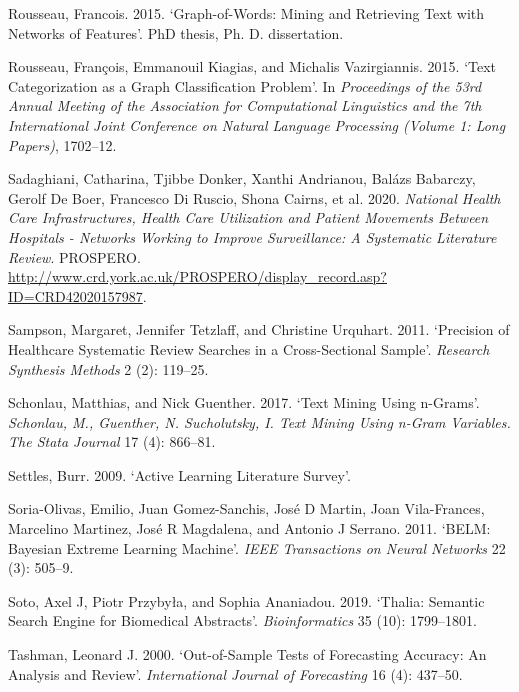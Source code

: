 \documentclass{article}
\newlength{\cslhangindent}
\newlength{\cslentryspacingunit} %
\newenvironment{CSLReferences}[2] %
 {%
  \setlength{\parindent}{0pt}
  \ifodd #1
  \let\oldpar\par
  \def\par{\hangindent=\cslhangindent\oldpar}
  \fi
  \setlength{\parskip}{#2\cslentryspacingunit}
 }%
 {}
\begin{document}
\begin{CSLReferences}{1}{0}
\leavevmode{}%
Rousseau, Francois. 2015. {`Graph-of-Words: Mining and Retrieving Text
with Networks of Features'}. PhD thesis, Ph. D. dissertation.

\leavevmode{}%
Rousseau, François, Emmanouil Kiagias, and Michalis Vazirgiannis. 2015.
{`Text Categorization as a Graph Classification Problem'}. In
\emph{Proceedings of the 53rd Annual Meeting of the Association for
Computational Linguistics and the 7th International Joint Conference on
Natural Language Processing (Volume 1: Long Papers)}, 1702--12.

\leavevmode{}%
Sadaghiani, Catharina, Tjibbe Donker, Xanthi Andrianou, Balázs Babarczy,
Gerolf De Boer, Francesco Di Ruscio, Shona Cairns, et al. 2020.
\emph{National Health Care Infrastructures, Health Care Utilization and
Patient Movements Between Hospitals - Networks Working to Improve
Surveillance: A Systematic Literature Review}. PROSPERO.
\url{http://www.crd.york.ac.uk/PROSPERO/display_record.asp?ID=CRD42020157987}.

\leavevmode{}%
Sampson, Margaret, Jennifer Tetzlaff, and Christine Urquhart. 2011.
{`Precision of Healthcare Systematic Review Searches in a
Cross-Sectional Sample'}. \emph{Research Synthesis Methods} 2 (2):
119--25.

\leavevmode{}%
Schonlau, Matthias, and Nick Guenther. 2017. {`Text Mining Using
n-Grams'}. \emph{Schonlau, M., Guenther, N. Sucholutsky, I. Text Mining
Using n-Gram Variables. The Stata Journal} 17 (4): 866--81.

\leavevmode{}%
Settles, Burr. 2009. {`Active Learning Literature Survey'}.

\leavevmode{}%
Soria-Olivas, Emilio, Juan Gomez-Sanchis, José D Martin, Joan
Vila-Frances, Marcelino Martinez, José R Magdalena, and Antonio J
Serrano. 2011. {`BELM: Bayesian Extreme Learning Machine'}. \emph{IEEE
Transactions on Neural Networks} 22 (3): 505--9.

\leavevmode{}%
Soto, Axel J, Piotr Przybyła, and Sophia Ananiadou. 2019. {`Thalia:
Semantic Search Engine for Biomedical Abstracts'}. \emph{Bioinformatics}
35 (10): 1799--1801.

\leavevmode{}%
Tashman, Leonard J. 2000. {`Out-of-Sample Tests of Forecasting Accuracy:
An Analysis and Review'}. \emph{International Journal of Forecasting} 16
(4): 437--50.


\end{CSLReferences}
\end{document}

